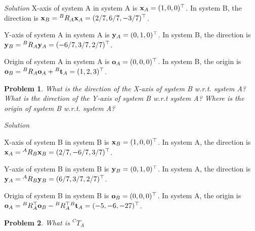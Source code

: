 \documentclass{article}
\newtheorem{prob}{Problem}
\numberwithin{prob}{section}
\newenvironment{solution}{\emph{Solution}}{}
\begin{document}
\begin{solution}
X-axis of system A in system A is $\mathbf{x}_A = (1, 0, 0)^\top$. In system B, the direction is $\mathbf{x}_B = {}^B R_A \mathbf{x}_A = (2/7, 6/7, -3/7)^\top$.


Y-axis of system A in system A is $\mathbf{y}_A = (0, 1, 0)^\top$. In system B, the direction is $\mathbf{y}_B = {}^B R_A \mathbf{y}_A = (-6/7, 3/7, 2/7)^\top$.


Origin of system A in system A is $\mathbf{o}_A = (0, 0, 0)^\top$. In system B, the origin is $\mathbf{o}_B = {}^B R_A \mathbf{o}_A + {}^B\mathbf{t}_A = (1, 2, 3)^\top$.

\end{solution}
\begin{prob}
What is the direction of the X-axis of system B w.r.t. system A? What is the direction of the Y-axis of system B w.r.t system A? Where is the origin of system B w.r.t. system A?
\end{prob}
\begin{solution}

X-axis of system B in system B is $\mathbf{x}_B = (1, 0, 0)^\top$. In system A, the direction is $\mathbf{x}_A = {}^A R_B \mathbf{x}_B = (2/7, -6/7, 3/7)^\top$.


Y-axis of system B in system B is $\mathbf{y}_B = (0, 1, 0)^\top$. In system A, the direction is $\mathbf{y}_A = {}^A R_B \mathbf{y}_B = (6/7, 3/7, 2/7)^\top$.


Origin of system B in system B is $\mathbf{o}_B = (0, 0, 0)^\top$. In system A, the origin is $\mathbf{o}_A = {}^B R_A^\top \mathbf{o}_B - {}^B R_A^\top  {}^B\mathbf{t}_A = (-5, -6, -27)^\top$.

\end{solution}
\begin{prob}
  What is ${}^CT_A$
\end{prob}
\end{document}
